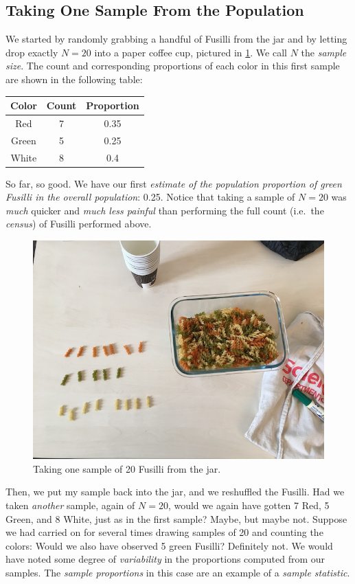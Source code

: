 \documentclass[]{book}
\begin{document}
\subsection{Taking One Sample From the
Population}\label{taking-one-sample-from-the-population}

We started by randomly grabbing a handful of Fusilli from the jar and by
letting drop exactly \(N=20\) into a paper coffee cup, pictured in
\ref{fig:pasta5}. We call \(N\) the \emph{sample size}. The count and
corresponding proportions of each color in this first sample are shown
in the following table:

\begin{longtable}[]{@{}ccc@{}}
\toprule
Color & Count & Proportion\tabularnewline
\midrule
\endhead
Red & 7 & 0.35\tabularnewline
Green & 5 & 0.25\tabularnewline
White & 8 & 0.4\tabularnewline
\bottomrule
\end{longtable}

So far, so good. We have our first \emph{estimate of the population
proportion of green Fusilli in the overall population}: 0.25. Notice
that taking a sample of \(N=20\) was \emph{much} quicker and \emph{much
less painful} than performing the full count (i.e.~the \emph{census}) of
Fusilli performed above.

\begin{figure}
\includegraphics[width=0.9\linewidth]{images/pasta5} \caption{Taking one sample of 20 Fusilli from the jar.}\label{fig:pasta5}
\end{figure}

Then, we put my sample back into the jar, and we reshuffled the Fusilli.
Had we taken \emph{another} sample, again of \(N=20\), would we again
have gotten 7 Red, 5 Green, and 8 White, just as in the first sample?
Maybe, but maybe not. Suppose we had carried on for several times
drawing samples of 20 and counting the colors: Would we also have
observed 5 green Fusilli? Definitely not. We would have noted some
degree of \emph{variability} in the proportions computed from our
samples. The \emph{sample proportions} in this case are an example of a
\emph{sample statistic}.
\end{document}
